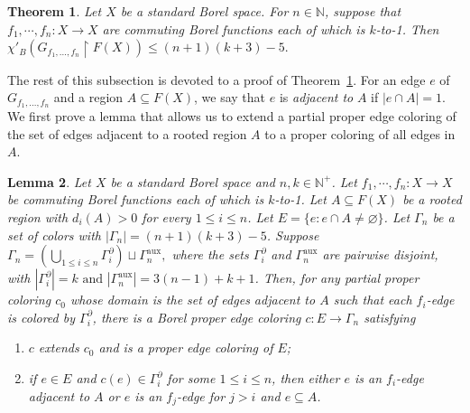 \documentclass[11pt, reqno, a4paper]{amsart}
\newtheorem{theorem}{Theorem}[section]
\newtheorem{lemma}[theorem]{Lemma}
\theoremstyle{definition}
\theoremstyle{plain}
\begin{document}
\begin{theorem}
\label{thm:edgecoloring}
    Let $X$ be a standard Borel space. For $n\in\mathbb{N}$, suppose that $f_1,\cdots,f_n:X\to X$ are commuting Borel functions each of which is $k$-to-1. 
 Then $\chi'_B(G_{f_1,...,f_n}\upharpoonright F(X))\leq (n+1)(k+3)-5.$
\end{theorem}

The rest of this subsection is devoted to a proof of Theorem~\ref{thm:edgecoloring}. %
For an edge $e$ of $G_{f_1,\dots,f_n}$ and a region $A\subseteq F(X)$, we say that $e$ is \emph{adjacent to} $A$ if $|e\cap A|=1$.
We first prove a lemma that allows us to extend a partial proper edge coloring of the set of edges adjacent to a rooted region $A$ to a proper coloring of all edges in $A$.

\begin{lemma}\label{lem:localcolor}
     Let $X$ be a standard Borel space and $n,k\in\mathbb{N}^+$. Let $f_1,\cdots,f_n:X\to X$ be commuting Borel functions each of which is $k$-to-1. Let $A\subseteq F(X)$ be a rooted region with $d_i(A)>0$ for every $1\le i\le n$. Let $E=\{e\colon e\cap A\neq\varnothing\}$. 
Let $\Gamma_n$ be a set of colors with $|\Gamma_n|=(n+1)(k+3)-5$. Suppose $\Gamma_n=\left(\bigcup_{1\le i\le n}\Gamma_i^\partial\right)\sqcup \Gamma_n^{\mathrm{aux}},$ where the sets $\Gamma_i^\partial$ and $\Gamma_n^{\mathrm{aux}}$ are pairwise disjoint, with
$|\Gamma_i^\partial|=k
\text{ and }
|\Gamma_n^{\mathrm{aux}}|=3(n-1)+k+1$. Then, for any partial proper coloring $c_0$  whose domain is the set of edges adjacent to $A$ such that each $f_i$-edge is colored by $\Gamma_i^\partial$, there is a Borel proper edge coloring $c\colon E \rightarrow \Gamma_n$ satisfying
    \begin{enumerate}[label={\rm (\roman*)},leftmargin=3.2em]
     \item $c$ extends $c_0$ and is a proper edge coloring of $E$;
     \item if $e\in E$ and $c(e)\in \Gamma_i^\partial$ for some $1\le i \le n$, then either $e$ is an $f_i$-edge adjacent to $A$  or $e$ is an $f_{j}$-edge for $j > i$ and $e \subseteq A$. 
 \end{enumerate}
\end{lemma}
\end{document}

